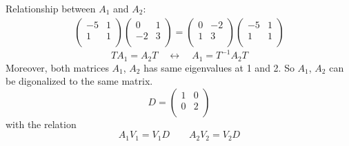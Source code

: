 \documentclass[12pt,a4paper]{article}
\begin{document}
Relationship between $A_{1}$ and $A_{2}$:
\begin{gather*}
\begin{pmatrix}
-5 & 1\\
1 & 1 \\
\end{pmatrix}
\begin{pmatrix}
0 & 1\\
-2 &3 \\
\end{pmatrix}
=
\begin{pmatrix}
0 & -2\\
1 &3 \\
\end{pmatrix}
\begin{pmatrix}
-5 & 1\\
1 & 1 \\
\end{pmatrix}
\end{gather*}
\[TA_{1} = A_{2}T \quad \leftrightarrow \quad A_{1}=T^{-1}A_{2}T\]
Moreover,  both matrices $A_{1}$, $A_{2}$ has same eigenvalues at 1 and 2. So $A_{1}$, $A_{2}$ can be digonalized to the same matrix.
\[D = \begin{pmatrix}
1 & 0\\
0 & 2\\
\end{pmatrix}
\]
with the relation
\[A_{1}V_{1} = V_{1}D \quad \quad A_{2}V_{2} = V_{2}D\]
\end{document}
